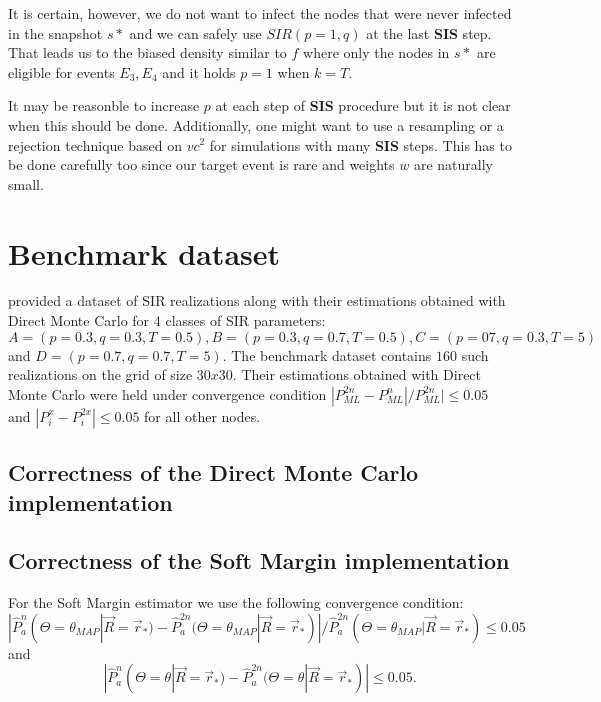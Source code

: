 \documentclass[times, utf8, diplomski]{fer}
\begin{document}
It is certain, however, we do not want to infect the nodes that were never infected in the snapshot $s*$ and we can safely use $SIR(p = 1, q)$ at the last \textbf{SIS} step. That leads us to the biased density similar to $f$ where only the nodes in $s*$ are eligible for events $E_3, E_4$ and it holds $p = 1$ when $k = T$.

It may be reasonble to increase $p$ at each step of \textbf{SIS} procedure but it is not clear when this should be done. Additionally, one might want to use a resampling or a rejection technique based on $vc^2$ for simulations with many  \textbf{SIS} steps. This has to be done carefully too since our target event is rare and weights $w$ are naturally small.



\chapter{Benchmark dataset}
\label{Bench}

\citet{Nino} provided a dataset of SIR realizations along with their estimations obtained with Direct Monte Carlo for $4$ classes of SIR parameters: $A = (p = 0.3, q = 0.3, T =0 .5), B = (p = 0.3, q = 0.7, T = 0.5), C = (p = 07, q = 0.3, T = 5)$ and  $D = (p = 0.7, q = 0.7, T = 5)$. The benchmark dataset contains $160$ such realizations on the grid of size $30x30$.
 Their estimations obtained with Direct Monte Carlo were held under convergence condition $|P_{ML}^{2n} - P_{ML}^{n}| / P_{ML}^{2n}| \leq 0.05$  and $|P_i^x - P_i^{2x}| \leq 0.05$ for all other nodes. %

\section{Correctness of the Direct Monte Carlo implementation}

\section{Correctness of the Soft Margin implementation}
For the Soft Margin estimator we use the following convergence condition: 
\begin{equation*}
|\hat{P}_a^{n}(\Theta = \theta_{MAP} | \vec{R} = \vec{r}_*) - \hat{P}_a^{2n}(\Theta = \theta_{MAP} | \vec{R} = \vec{r}_*)| / \hat{P}_a^{2n}(\Theta = \theta_{MAP} | \vec{R} = \vec{r}_*) \leq 0.05 
\end{equation*}
and
\begin{equation*}
|\hat{P}_a^{n}(\Theta = \theta | \vec{R} = \vec{r}_*) - \hat{P}_a^{2n}(\Theta = \theta | \vec{R} = \vec{r}_*)| \leq 0.05.
\end{equation*}
\end{document}

